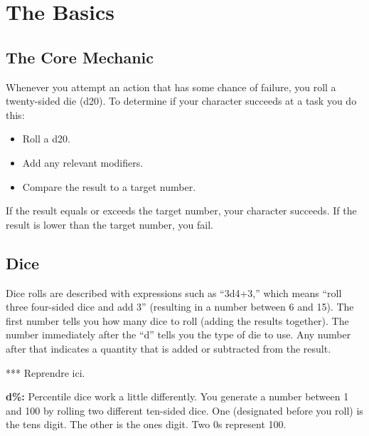 \begin{comment}
\documentclass{article}
\usepackage{ifxetex}
\ifxetex
\usepackage{fontspec}
\setmainfont[Mapping=tex-text]{STIXGeneral}
\else
\usepackage[T1]{fontenc}
\usepackage[utf8]{inputenc}
\fi
\usepackage{textcomp}

\usepackage{array}
\usepackage{amssymb}
\usepackage{fancyhdr}
\renewcommand{\headrulewidth}{0pt}
\renewcommand{\footrulewidth}{0pt}


\end{comment}

\chapter{The Basics}

\section{The Core Mechanic}


Whenever you attempt an action that has some chance of failure, you roll a twenty-sided die (d20). To determine if your character succeeds at a task you do this:
\begin{itemize}
\item Roll a d20.
\item Add any relevant modifiers.
\item Compare the result to a target number.
\end{itemize}

If the result equals or exceeds the target number, your character succeeds. If the result is lower than the target number, you fail.

\section{Dice}

Dice rolls are described with expressions such as ``3d4+3,'' which means ``roll three four-sided dice and add 3'' (resulting in a number between 6 and 15). The first number tells you how many dice to roll (adding the results together). The number immediately after the ``d'' tells you the type of die to use. Any number after that indicates a quantity that is added or subtracted from the result.

*** Reprendre ici.

\vspace{12pt}
\textbf{d\%:} Percentile dice work a little differently. You generate a number 
between 1 and 100 by rolling two different ten-sided dice. One (designated before 
you roll) is the tens digit. The other is the ones digit. Two 0s represent 100.


